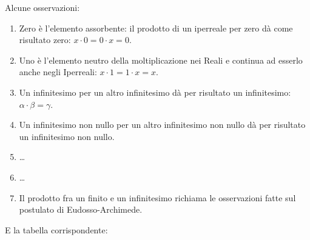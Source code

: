 \begin{multicols}{2}
Alcune osservazioni:
\begin{enumerate} [noitemsep]
 \item Zero è l'elemento assorbente: il prodotto di un iperreale per zero
dà come risultato zero: \(x \cdot 0=0 \cdot x=0\).
 \item Uno è l'elemento neutro della moltiplicazione nei Reali e continua 
ad esserlo anche negli Iperreali: \(x \cdot 1=1 \cdot x=x\).
 \item Un infinitesimo per un altro infinitesimo dà per risultato un 
infinitesimo: \(\alpha \cdot \beta=\gamma\).
 \item Un infinitesimo non nullo per un altro infinitesimo non nullo dà 
per risultato un infinitesimo non nullo.
 \item \dots
 \item \dots
 \item Il prodotto fra un finito e un infinitesimo richiama le osservazioni 
fatte sul postulato di Eudosso-Archimede.
 \end{enumerate}
E la tabella corrispondente:
\begin{center}
\renewcommand{\arraystretch}{.0}
\end{center}
\end{multicols}

